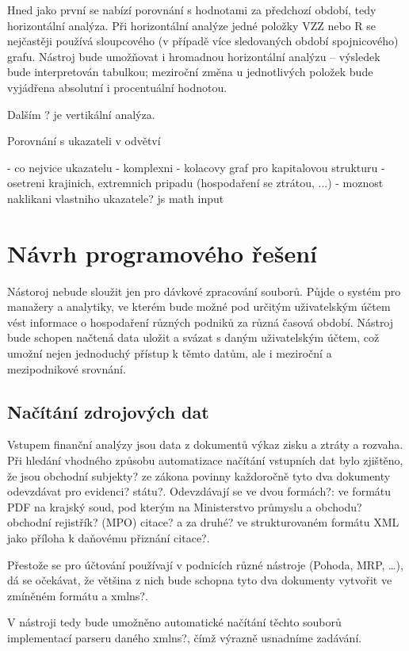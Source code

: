 Hned jako první se nabízí porovnání s hodnotami za předchozí období, tedy horizontální analýza. Při horizontální analýze jedné položky VZZ nebo R se nejčastěji používá sloupcového (v případě více sledovaných období spojnicového) grafu. Nástroj bude umožňovat i hromadnou horizontální analýzu -- výsledek bude interpretován tabulkou; meziroční změna u jednotlivých položek bude vyjádřena absolutní i procentuální hodnotou. 

Dalším ? je vertikální analýza.


Porovnání s ukazateli v odvětví

- co nejvice ukazatelu - komplexni
- kolacovy graf pro kapitalovou strukturu
- osetreni krajinich, extremnich pripadu (hospodaření se ztrátou, ...)
- moznost naklikani vlastniho ukazatele? js math input



\section{Návrh programového řešení}

Nástoroj nebude sloužit jen pro dávkové zpracování souborů. Půjde o systém pro manažery a analytiky, ve kterém bude možné pod určitým uživatelským účtem vést informace o hospodaření různých podniků za různá časová období. Nástroj bude schopen načtená data uložit a svázat s daným uživatelským účtem, což umožní nejen jednoduchý přístup k těmto datům, ale i meziroční a mezipodnikové srovnání.

\subsection{Načítání zdrojových dat}
Vstupem finanční analýzy jsou data z dokumentů výkaz zisku a ztráty a rozvaha. Při hledání vhodného způsobu automatizace načítání vstupních dat bylo zjištěno, že jsou obchodní subjekty? ze zákona povinny každoročně tyto dva dokumenty odevzdávat pro evidenci? státu?. Odevzdávají se ve dvou formách?: ve formátu PDF na krajský soud, pod kterým na Ministerstvo průmyslu a obchodu? obchodní rejistřík? (MPO) citace? a za druhé? ve strukturovaném formátu XML jako příloha k daňovému přiznání citace?.

Přestože se pro účtování používají v podnicích různé nástroje (Pohoda, MRP, \dots), dá se očekávat, že většina z nich bude schopna tyto dva dokumenty vytvořit ve zmíněném formátu a xmlns?.

V nástroji tedy bude umožněno automatické načítání těchto souborů implementací parseru daného xmlns?, čímž výrazně usnadníme zadávání.

